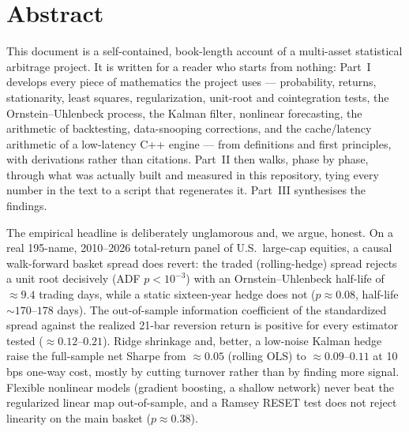 
\section*{Abstract}
\label{sec:abstract}

This document is a self-contained, book-length account of a multi-asset statistical
arbitrage project. It is written for a reader who starts from nothing: Part~I develops
every piece of mathematics the project uses --- probability, returns, stationarity,
least squares, regularization, unit-root and cointegration tests, the
Ornstein--Uhlenbeck process, the Kalman filter, nonlinear forecasting, the arithmetic
of backtesting, data-snooping corrections, and the cache/latency arithmetic of a
low-latency C++ engine --- from definitions and first principles, with derivations
rather than citations. Part~II then walks, phase by phase, through what was actually
built and measured in this repository, tying every number in the text to a script that
regenerates it. Part~III synthesises the findings.

The empirical headline is deliberately unglamorous and, we argue, honest. On a real
195-name, 2010--2026 total-return panel of U.S.\ large-cap equities, a causal
walk-forward basket spread does revert: the traded (rolling-hedge) spread rejects a
unit root decisively (ADF $p<10^{-3}$) with an Ornstein--Uhlenbeck half-life of
$\approx 9.4$ trading days, while a static sixteen-year hedge does not
($p\approx0.08$, half-life $\sim 170$--$178$ days). The out-of-sample information
coefficient of the standardized spread against the realized 21-bar reversion return is
positive for every estimator tested ($\approx 0.12$--$0.21$). Ridge shrinkage and,
better, a low-noise Kalman hedge raise the full-sample net Sharpe from
$\approx 0.05$ (rolling OLS) to $\approx 0.09$--$0.11$ at 10\,bps one-way cost, mostly
by cutting turnover rather than by finding more signal. Flexible nonlinear models
(gradient boosting, a shallow network) never beat the regularized linear map
out-of-sample, and a Ramsey RESET test does not reject linearity on the main basket
($p\approx0.38$).

